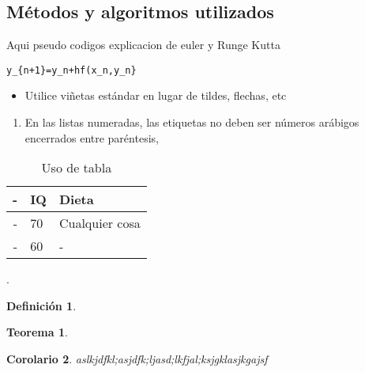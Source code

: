 \documentclass{wscpaperproc}
\theoremstyle{wsc}
\newtheorem{theorem}{Teorema}
\newtheorem{corollary}[theorem]{Corolario}
\newtheorem{definition}{Definici\'on}
\begin{document}
\subsection{M\'etodos y algoritmos utilizados}
Aqui pseudo codigos explicacion de euler y Runge Kutta

\begin{verbatim}
y_{n+1}=y_n+hf(x_n,y_n}
\end{verbatim}


\begin{itemize}
	\item Utilice vi\~netas est\'andar en lugar de tildes, flechas, etc
\end{itemize}
\begin{enumerate}
	\item En las listas numeradas, las etiquetas no deben ser n\'umeros ar\'abigos encerrados entre par\'entesis,
\end{enumerate}


\begin{table}[htb]
	\centering
	\caption{Uso de tabla\label{tab: first}}
	\begin{tabular}{rll}
		\hline
		- & IQ & Dieta          \\ \hline
		- & 70 & Cualquier cosa \\
		- & 60 & -              \\
		\hline
	\end{tabular}
\end{table}



.
\begin{definition}

\end{definition}

\begin{theorem}

\end{theorem}

\begin{corollary}
	aslkjdfkl;asjdfk;ljasd;lkfjal;ksjgklasjkgajsf
\end{corollary}

\end{document}
